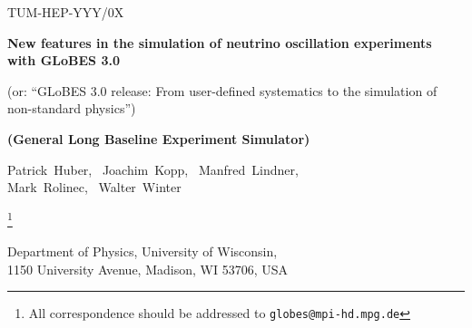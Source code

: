 \documentclass[12pt,a4paper]{article}
\begin{document}

\begin{titlepage}

\renewcommand{\thefootnote}{\alph{footnote}}

\vspace*{-3.cm}
\begin{flushright}
TUM-HEP-YYY/0X\\
\end{flushright}

\vspace*{0.5cm}

\renewcommand{\thefootnote}{\fnsymbol{footnote}}
\setcounter{footnote}{-1}

{\begin{center}
{\Large\bf New features in the simulation of neutrino oscillation experiments with GLoBES 3.0}

(or: ``GLoBES 3.0 release: From user-defined systematics to the simulation of non-standard physics'')
\end{center}}
{\begin{center}
{\large\bf (General Long Baseline Experiment Simulator)}
\end{center}}
\renewcommand{\thefootnote}{\alph{footnote}}

\vspace*{.8cm}
{\begin{center} {\large{\sc
                Patrick~Huber\footnotemark[1],~
                Joachim~Kopp\footnotemark[2],~
                Manfred~Lindner\footnotemark[2], \\
                Mark~Rolinec\footnotemark[3],~
                Walter~Winter\footnotemark[4]
                }}

\footnote{All correspondence should be addressed to {\tt globes@mpi-hd.mpg.de}}

\end{center}}
\vspace*{0cm}
{\it
\begin{center}

\footnotemark[1]%
       Department of Physics, University of Wisconsin, \\
       1150 University Avenue, Madison, WI 53706, USA


\end{center}}
\end{titlepage}
\end{document}
